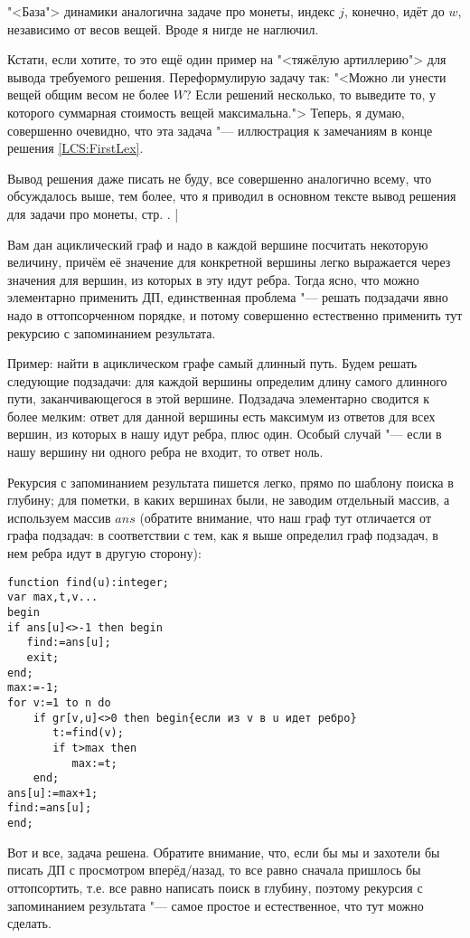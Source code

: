 "<База"> динамики аналогична задаче про монеты, индекс $j$, конечно, идёт до $w$, независимо от 
весов вещей. Вроде я нигде не наглючил.

Кстати, если хотите, то это ещё один пример на "<тяжёлую артиллерию"> для вывода требуемого 
решения. Переформулирую задачу так: "<Можно ли унести вещей общим весом не более $W$? Если решений 
несколько, то выведите то, у которого суммарная стоимость вещей максимальна."> Теперь, я думаю, 
совершенно очевидно, что эта задача "--- иллюстрация к замечаниям в конце решения 
\ref{LCS:FirstLex}.

Вывод решения даже писать не буду, все совершенно аналогично всему, что обсуждалось выше, тем 
более, что я приводил в основном тексте вывод решения для задачи про монеты, стр. \pageref{coins_out}.
|

 Вам дан ациклический граф и надо в каждой вершине посчитать
некоторую величину, причём её значение для конкретной вершины легко выражается через значения для
вершин, из которых в эту идут ребра. Тогда ясно, что можно элементарно применить ДП, единственная
проблема "--- решать подзадачи явно надо в оттопсорченном порядке, и потому совершенно естественно
применить тут рекурсию с запоминанием результата.

Пример: найти в ациклическом графе самый длинный путь. Будем решать следующие подзадачи: для каждой
вершины определим длину самого длинного пути, заканчивающегося в этой вершине. Подзадача элементарно
сводится к более мелким: ответ для данной вершины есть максимум из ответов для всех вершин, из
которых в нашу идут ребра, плюс один. Особый случай "--- если в нашу вершину ни одного ребра не
входит, то ответ ноль.

Рекурсия с запоминанием результата пишется легко, прямо по шаблону поиска в глубину; для пометки, в
каких вершинах были, не заводим отдельный массив, а используем массив $ans$ (обратите внимание, что наш граф тут отличается от графа подзадач: в соответствии с тем, как я выше определил граф подзадач, в нем ребра идут в другую сторону):

\begin{codesampleo}\begin{verbatim}
function find(u):integer;
var max,t,v...
begin
if ans[u]<>-1 then begin
   find:=ans[u];
   exit;
end;
max:=-1;
for v:=1 to n do
    if gr[v,u]<>0 then begin{если из v в u идет ребро}
       t:=find(v);
       if t>max then
          max:=t;
    end;
ans[u]:=max+1;
find:=ans[u];
end;
\end{verbatim}
\end{codesampleo}
Вот и все, задача решена. Обратите внимание, что, если бы мы и захотели бы писать ДП с просмотром
вперёд/назад, то все равно сначала пришлось бы оттопсортить, т.е. все равно написать поиск в
глубину, поэтому рекурсия с запоминанием результата "--- самое простое и естественное, что тут можно
сделать.

